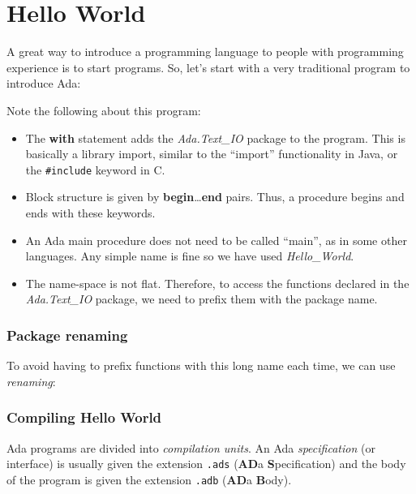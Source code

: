 \section{Hello World}

A great way to introduce a programming language to people with programming experience is to start programs. So, let's start with a very traditional program to introduce Ada:




Note the following about this program:

\begin{itemize}

  \item The {\bf with} statement adds the {\em Ada.Text\_IO} package
    to the program. This is basically a library import, similar to the ``import'' functionality in Java, or the \texttt{\#include} keyword in C.

  \item Block structure is given by {\bf begin}\ldots{\bf end} pairs. Thus, a procedure begins and ends with these keywords.

  \item An Ada main procedure does not need to be called ``main'', as in some other languages. Any  simple name is fine so we have used  {\em Hello\_World}.

  \item The name-space is not flat. Therefore, to access the functions declared in the \emph{Ada.Text\_IO} package, we need to prefix them with the package name.

\end{itemize}

\subsubsection*{Package renaming}

To avoid having to prefix functions with this long name each time, we can use \emph{renaming}:




\subsubsection*{Compiling Hello World}
  
Ada programs are divided into {\em compilation units}. An Ada \emph{specification} (or interface) is usually given the extension
      \texttt{.ads} (\textbf{AD}a \textbf{S}pecification) and the body of the program is given the extension
      \texttt{.adb} (\textbf{AD}a \textbf{B}ody).

